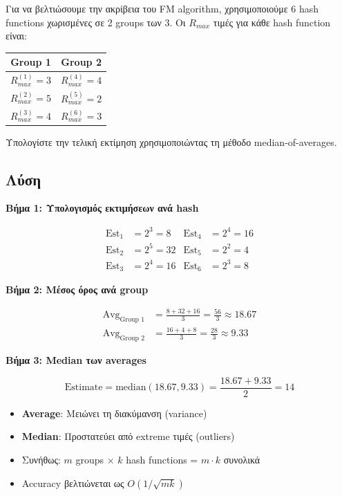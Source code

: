 \begin{formulabox}[Εκφώνηση]
Για να βελτιώσουμε την ακρίβεια του FM algorithm, χρησιμοποιούμε 6 hash functions
χωρισμένες σε 2 groups των 3. Οι $R_{max}$ τιμές για κάθε hash function είναι:

\begin{center}
\begin{tabular}{cc}
\toprule
\textbf{Group 1} & \textbf{Group 2} \\
\midrule
$R^{(1)}_{max} = 3$ & $R^{(4)}_{max} = 4$ \\
$R^{(2)}_{max} = 5$ & $R^{(5)}_{max} = 2$ \\
$R^{(3)}_{max} = 4$ & $R^{(6)}_{max} = 3$ \\
\bottomrule
\end{tabular}
\end{center}

Υπολογίστε την τελική εκτίμηση χρησιμοποιώντας τη μέθοδο median-of-averages.
\end{formulabox}

\subsection*{Λύση}

\textbf{Βήμα 1: Υπολογισμός εκτιμήσεων ανά hash}

\begin{align*}
\text{Est}_1 &= 2^3 = 8 & \text{Est}_4 &= 2^4 = 16 \\
\text{Est}_2 &= 2^5 = 32 & \text{Est}_5 &= 2^2 = 4 \\
\text{Est}_3 &= 2^4 = 16 & \text{Est}_6 &= 2^3 = 8
\end{align*}

\textbf{Βήμα 2: Μέσος όρος ανά group}

\begin{align*}
\text{Avg}_{\text{Group 1}} &= \frac{8 + 32 + 16}{3} = \frac{56}{3} \approx 18.67 \\
\text{Avg}_{\text{Group 2}} &= \frac{16 + 4 + 8}{3} = \frac{28}{3} \approx 9.33
\end{align*}

\textbf{Βήμα 3: Median των averages}

$$\text{Estimate} = \text{median}(18.67, 9.33) = \frac{18.67 + 9.33}{2} = 14$$

\begin{infobox}
\begin{itemize}
    \item \textbf{Average}: Μειώνει τη διακύμανση (variance)
    \item \textbf{Median}: Προστατεύει από extreme τιμές (outliers)
    \item Συνήθως: $m$ groups × $k$ hash functions = $m \cdot k$ συνολικά
    \item Accuracy βελτιώνεται ως $O(1/\sqrt{mk})$
\end{itemize}
\end{infobox}

